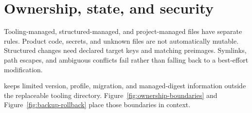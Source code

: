 \section{Ownership, state, and security}
\label{chap:ownership-state-security}

Tooling-managed, structured-managed, and project-managed files have separate rules.
Product code, secrets, and unknown files are not automatically mutable. Structured changes
need declared target keys and matching preimages. Symlinks, path escapes, and ambiguous
conflicts fail rather than falling back to a best-effort modification.

\ToolingState{} keeps limited version, profile, migration, and managed-digest information
outside the replaceable tooling directory. Figure~\ref{fig:ownership-boundaries} and
Figure~\ref{fig:backup-rollback} place those boundaries in context.
